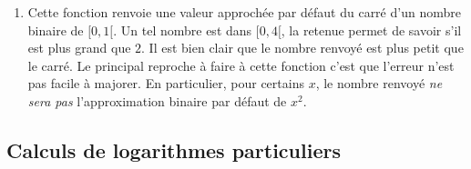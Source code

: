 \begin{enumerate}
\begin{enumerate}
  \item Cette fonction renvoie une valeur approchée par défaut du carré d'un nombre binaire de $[0,1[$. Un tel nombre est dans $[0,4[$, la retenue permet de savoir s'il est plus grand que $2$. Il est bien clair que le nombre renvoyé est plus petit que le carré. Le principal reproche à faire à cette fonction c'est que l'erreur n'est pas facile à majorer. En particulier, pour certains $x$, le nombre renvoyé \emph{ne sera pas} l'approximation binaire par défaut de $x^2$.
\end{enumerate}

\end{enumerate}

\subsection{Calculs de logarithmes particuliers}
